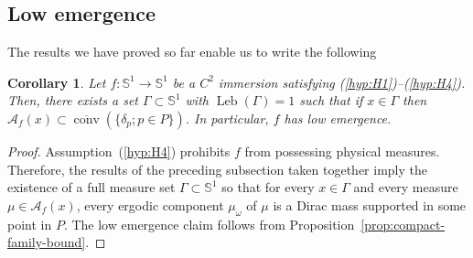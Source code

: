 \documentclass[12pt,a4paper,twoside]{article}
\theoremstyle{plain}
\newtheorem{corollary}[theorem]{Corollary}
\theoremstyle{definition}
\newcommand{\T}{{\mathbb{S}^1}}
\newcommand{\cA}{{\mathcal A}}
\newcommand{\Leb}{\operatorname{Leb}}
\begin{document}
\subsection{Low emergence}

The results we have proved so far enable us to write the following

\begin{corollary}
Let $f:\T\to\T$ be a $C^2$ immersion satisfying \emph{(\ref{hyp:H1})--(\ref{hyp:H4})}. Then, there exists a set $\Gamma\subset\T$ with $\Leb(\Gamma)=1$ such that if $x\in\Gamma$ then $\cA_{f}(x)\subset\overline{\operatorname{conv}}(\{\delta_p;p\in P\})$. In particular, $f$ has low emergence.
\end{corollary}

\begin{proof}
Assumption~(\ref{hyp:H4}) prohibits $f$ from possessing physical measures. Therefore, the results of the preceding subsection taken together imply the existence of a full measure set $\Gamma\subset\T$ so that for every $x\in\Gamma$ and every measure $\mu\in\cA_{f}(x)$, every ergodic component $\mu_{\omega}$ of $\mu$ is a Dirac mass supported in some point in $P$. The low emergence claim follows from Proposition~\ref{prop:compact-family-bound}.
\end{proof}






















\end{document}
